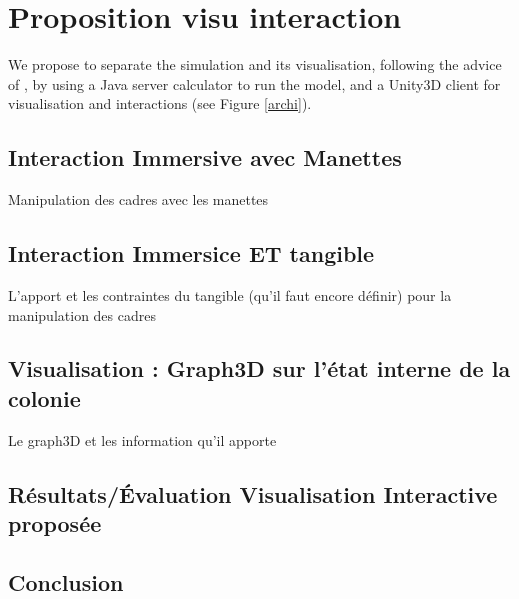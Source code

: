 \chapter{Proposition visu interaction}
	We propose to separate the simulation and its visualisation, following the advice of \cite{louloudi}, by using a Java server calculator to run the model, and a Unity3D client for visualisation and interactions (see Figure \ref{archi}).
	\section{Interaction Immersive avec Manettes}
		Manipulation des cadres avec les manettes
	\section{Interaction Immersice ET tangible}
		L'apport et les contraintes du tangible (qu'il faut encore définir) pour la manipulation des cadres
	\section{Visualisation : Graph3D sur l'état interne de la colonie}
		Le graph3D et les information qu'il apporte
	\section{Résultats/Évaluation Visualisation Interactive proposée}
	\label{sectionExpe}
	
			
	\section*{Conclusion}
	
